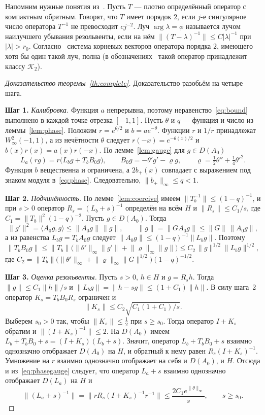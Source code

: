 \documentclass[12pt,a4paper]{article}
\theoremstyle{definition}
\newcommand{\step}[1]{\smallskip\noindent\textbf{Шаг #1.}}
\newcommand{\norm}[1]{\lVert#1\rVert}
\newcommand{\abs}[1]{\lvert#1\rvert}
\newcommand{\inner}[2]{\langle#1,#2\rangle}
\begin{document}
Напомним нужные понятия из~\cite[\S\S2,~4]{Shk}. Пусть $T$ --- плотно определённый оператор с
компактным обратным. Говорят, что $T$ имеет порядок $2$, если $j$-е сингулярное число
оператора $T^{-1}$ не превосходит $cj^{-2}$. Луч $\arg\lambda=\phi$ называется лучом
наилучшего убывания резольвенты, если на нём
$\norm{(T-\lambda)^{-1}}\le C\abs\lambda^{-1}$ при $\abs\lambda>r_0$.
Согласно~\cite[теорема~4.7]{Shk} система корневых векторов оператора порядка $2$,
имеющего хотя бы один такой луч, полна (в обозначениях~\cite{Shk} такой оператор
принадлежит классу $\mathcal K_2$).

\begin{proof}[Доказательство теоремы~\ref{th:complete}]
Доказательство разобьём на четыре шага.

\step{1} \emph{Калибровка.} Функция $a$ непрерывна, поэтому
неравенство~\eqref{eq:bound} выполнено в каждой точке отрезка $[-1,1]$. Пусть $\theta$ и
$q$ --- функция и число из леммы~\ref{lem:phase}. Положим $r=e^{\theta/2}$ и
$b=ae^{-\theta}$. Функции $r$ и $1/r$ принадлежат $W^2_\infty(-1,1)$, а из нечётности
$\theta$ следует $r(-x)=e^{-\theta(x)/2}$ и $b(x)r(x)=a(x)r(-x)$. По
лемме~\ref{lem:gauge} для $g\in D(A_0)$
\begin{equation}\label{eq:phasegauge}
 L_a(rg)=r\bigl(L_bg+T_bB_0g\bigr),\qquad
 B_0g=-\theta'g'-\varrho g,\qquad\varrho=\tfrac12\theta''+\tfrac14\theta'^2 .
\end{equation}
Функция $b$ вещественна и ограничена, а $2b_+(x)$ совпадает с выражением под знаком
модуля в~\eqref{eq:phase}. Следовательно, $\norm{b_+}_\infty\le q<1$.

\step{2} \emph{Подчинённость.} По лемме~\ref{lem:coercive} имеем
$\norm{T_b^{-1}}\le(1-q)^{-1}$, и при $s>0$ оператор $R_s=(L_b+s)^{-1}$ определён на всём
$H$ и $\norm{R_s}\le C_1/s$, где $C_1=\norm{T_b}^2(1-q)^{-2}$. Пусть $g\in D(A_0)$. Тогда
\[
 \norm{g'}^2=\inner{A_0g}{g}\le\norm{A_0g}\,\norm g,\qquad
 \norm g=\norm{GA_0g}\le\norm G\,\norm{A_0g},
\]
а из равенства $L_bg=T_bA_0g$ следует $\norm{A_0g}\le(1-q)^{-1}\norm{L_bg}$. Поэтому
\[
 \norm{T_bB_0g}\le\norm{T_b}\bigl(\norm{\theta'}_\infty\norm{g'}
 +\norm\varrho_\infty\norm g\bigr)\le C_2\,\norm g^{1/2}\norm{L_bg}^{1/2},
\]
где $C_2=\norm{T_b}\bigl(\norm{\theta'}_\infty+\norm\varrho_\infty\norm G^{1/2}\bigr)
(1-q)^{-1/2}$.

\step{3} \emph{Оценка резольвенты.} Пусть $s>0$, $h\in H$ и $g=R_sh$. Тогда
$\norm g\le C_1\norm h/s$ и $\norm{L_bg}=\norm{h-sg}\le(1+C_1)\norm h$. В силу шага~2
оператор $K_s=T_bB_0R_s$ ограничен и
\[
 \norm{K_s}\le C_2\sqrt{C_1(1+C_1)/s}.
\]
Выберем $s_0>0$ так, чтобы $\norm{K_s}\le\tfrac12$ при $s\ge s_0$. Тогда оператор
$I+K_s$ обратим и $\norm{(I+K_s)^{-1}}\le2$. На $D(A_0)$ имеем
$L_b+T_bB_0+s=(I+K_s)(L_b+s)$. Значит, оператор $L_b+T_bB_0+s$ взаимно однозначно
отображает $D(A_0)$ на $H$, и обратный к нему равен $R_s(I+K_s)^{-1}$. Умножение на $r$
взаимно однозначно отображает на себя и $D(A_0)$, и $H$. Отсюда и
из~\eqref{eq:phasegauge} следует, что оператор $L_a+s$ взаимно однозначно отображает
$D(L_a)$ на $H$ и
\[
 \norm{(L_a+s)^{-1}}=\bigl\lVert rR_s(I+K_s)^{-1}r^{-1}\bigr\rVert
 \le\frac{2C_1e^{\norm\theta_\infty}}{s},\qquad s\ge s_0 .
\]


\end{proof}
\end{document}
